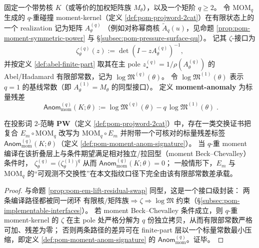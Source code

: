 \begin{definition}\label{def:pom-moment-anom-signature}
固定一个带势核 \(K\)（或等价的加权矩阵族 \(M_\theta\)），以及一个矩阶 \(q\ge 2\)。
令 \(\mathrm{MOM}_q\) 生成的 \(q\)-重碰撞 moment-kernel（定义 \ref{def:pom-projword-2cat}）在有限状态上的一个 realization 记为矩阵 \(A^{(q)}_\theta\)
（例如对称幂商核 \(\widetilde A_q(u)\)，见命题 \ref{prop:pom-moment-symmetric-power} 与 \S\ref{subsec:pom-pressure-surface-qu}）。
记其 \(\zeta\)-接口为
\[
\zeta^{(q)}_\theta(z):=\det(I-zA^{(q)}_\theta)^{-1},
\]
并按定义 \ref{def:abel-finite-part} 取其在主 pole \(z_\star^{(q)}=1/\rho(A^{(q)}_\theta)\) 的 Abel/Hadamard 有限部常数，记为 \(\log\mathfrak{M}^{(q)}(\theta)\)。
令 \(\log\mathfrak{M}^{(1)}(\theta)\) 表示 \(q=1\) 的基线常数（即 \(A^{(1)}_\theta=M_\theta\) 的同型接口）。
定义 \textbf{moment-anomaly} 为标量残差
\[
\boxed{\;
\mathsf{Anom}^{(q)}_{\mathrm{mom}}(K;\theta)
:=
\log\mathfrak{M}^{(q)}(\theta)
- q\,\log\mathfrak{M}^{(1)}(\theta)\;}.
\]
\end{definition}

\begin{proposition}\label{prop:pom-em-mom-residual-swap}
在投影词 $2$-范畴 \(\mathbf{PW}\)（定义 \ref{def:pom-projword-2cat}）中，存在一类交换证书把复合
\(
E_m\circ \mathrm{MOM}_q
\)
改写为
\(
\mathrm{MOM}_q\circ E_m
\)
并附带一个可核对的标量残差标签 \(\mathsf{Anom}^{(q)}_{\mathrm{mom}}(K;\theta)\)（定义 \ref{def:pom-moment-anom-signature}）。
当 \(q\)-重 moment 编译在该折叠层上与条件期望满足相对独立/拉回型（moment Beck--Chevalley）条件时，
\(\zeta^{(q)}_\theta=\bigl(\zeta^{(1)}_\theta\bigr)^q\)
从而 \(\mathsf{Anom}^{(q)}_{\mathrm{mom}}(K;\theta)=0\)；
一般情形下，\(E_m\) 与 \(\mathrm{MOM}_q\) 的“可观测不交换性”在本文指纹口径下完全由该有限部常数差承载。
\end{proposition}

\begin{proof}
与命题 \ref{prop:pom-em-lift-residual-swap} 同型，这是一个接口级封装：
两条编译路径都被同一闭环
\(
\text{有限核/矩阵族}\Rightarrow \zeta\Rightarrow \log\mathfrak{M}
\)
约束（\S\ref{subsec:pom-implementable-interfaces}）。
若 moment Beck--Chevalley 条件成立，则 \(q\)-重 moment-kernel 的 \(\zeta\) 在主 pole 处严格分解为 \(q\) 份独立拷贝，从而有限部常数严格可加、残差为零；
否则两条路径的差异可在 finite-part 层以一个标量常数最小压缩，即定义 \ref{def:pom-moment-anom-signature} 的 \(\mathsf{Anom}^{(q)}_{\mathrm{mom}}\)。证毕。
\end{proof}

